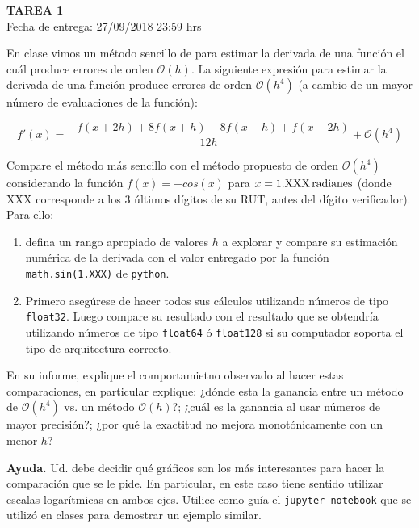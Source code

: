 \documentclass[letter, 11pt]{article}
\newcommand{\tareanro}{1}
\newcommand{\fechaentrega}{27/09/2018 23:59 hrs}
\begin{document}
\thispagestyle{firstpage}

\begin{center}
  {\uppercase{\LARGE \bf Tarea \tareanro}}\\
  Fecha de entrega: \fechaentrega
\end{center}




En clase vimos un método sencillo de para estimar la derivada de una función el
cuál produce errores de orden $\mathcal{O}(h)$. La siguiente expresión para
estimar la derivada de una función produce errores de orden $\mathcal{O}(h^4)$
(a cambio de un mayor número de evaluaciones de la función):

$$
f'(x) = \dfrac{-f(x+2h) + 8 f(x+h) -8 f(x-h) + f(x-2h)}{12h} + \mathcal{O}(h^4)
$$

Compare el método más sencillo con el método propuesto de orden
$\mathcal{O}(h^4)$ considerando la función $f(x)=-cos(x)$ para
$x=1.\rm{XXX\,radianes}$ (donde XXX corresponde a los 3 últimos dígitos de su
RUT, antes del dígito verificador). Para ello:

\begin{enumerate}

\item defina un rango apropiado de valores $h$ a explorar y compare su
  estimación numérica de la derivada con el valor entregado por la función
  \texttt{math.sin(1.\rm{XXX})} de \texttt{python}.

\item Primero asegúrese de hacer todos sus cálculos utilizando números de tipo
  \texttt{float32}. Luego compare su resultado con el resultado que se
  obtendría utilizando números de tipo \texttt{float64} ó \texttt{float128} si
  su computador soporta el tipo de arquitectura correcto.  

\end{enumerate}

En su informe, explique el comportamietno observado al hacer estas
comparaciones, en particular explique: ¿dónde esta la ganancia entre un método
de $\mathcal{O}(h^4)$ vs. un método $\mathcal{O}(h)$?; ¿cuál es la ganancia
al usar números de mayor precisión?; ¿por qué la exactitud no mejora
monotónicamente con un menor $h$?

\begin{ayuda}
  \small
  {\bf Ayuda.}
  Ud. debe decidir qué gráficos son los más interesantes para hacer la
  comparación que se le pide. En particular, en este caso tiene sentido
  utilizar escalas logarítmicas en ambos ejes. Utilice como guía el
  \texttt{jupyter notebook} que se utilizó en clases para demostrar un ejemplo
  similar.
\end{ayuda}
\end{document}
